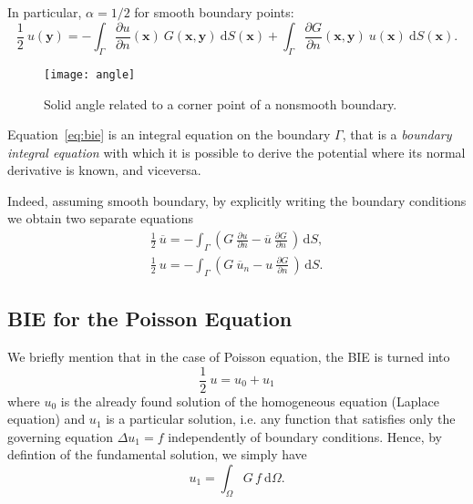 In particular, $\alpha=1/2$ for smooth boundary points:
\begin{equation}
\label{eq:bie}
\frac{1}{2}\ u(\mathbf{y}) =- \displaystyle\int_{\Gamma} \frac{\partial u}{\partial n}(\mathbf{x})\ G(\mathbf{x},\mathbf{y})\ \mathrm{d}S(\mathbf{x}) + \int_{\Gamma} \frac{\partial G}{\partial n}(\mathbf{x},\mathbf{y})\ u(\mathbf{x}) \ \mathrm{d}S(\mathbf{x}).
\end{equation}

\begin{figure}[H]
  \centering
    \texttt{[image: angle]}
    \caption{Solid angle related to a corner point of a nonsmooth boundary.} 
    \label{fig:angle}
\end{figure}

Equation~\eqref{eq:bie} is an integral equation on the boundary $\Gamma$, that is a \emph{boundary integral equation} with which it is possible to derive the potential where its normal derivative is known, and viceversa.

Indeed, assuming smooth boundary, by explicitly writing the boundary conditions we obtain two separate equations
\begin{align}
\frac{1}{2}\ \overline{u}=-\int_\Gamma \left( G\ \frac{\partial u}{\partial n} - \overline{u}\ \frac{\partial G}{\partial n}\, \right) \, \mathrm{d}S, \label{eq:u-known} \\
\frac{1}{2}\ u=-\int_\Gamma \left( G\ \overline{u}_n - u\ \frac{\partial G}{\partial n}\, \right) \, \mathrm{d}S. \label{eq:un-known} 
\end{align}

\subsection{BIE for the Poisson Equation}
\label{sub:BIE_for_the_poisson_equation}%

We briefly mention that in the case of Poisson equation, the BIE is turned into
\begin{equation*}
\frac{1}{2}\ u = u_0+u_1 
\end{equation*}
where $u_0$ is the already found solution of the homogeneous equation (Laplace equation) and $u_1$ is a particular solution, i.e. any function that satisfies only the governing equation $\Delta u_1=f$ independently of boundary conditions. Hence, by defintion of the fundamental solution, we simply have
\begin{equation}
\label{eq:PassoAsso}
u_1=\int_\Omega G\,f\ \mathrm{d}\Omega.
\end{equation}











